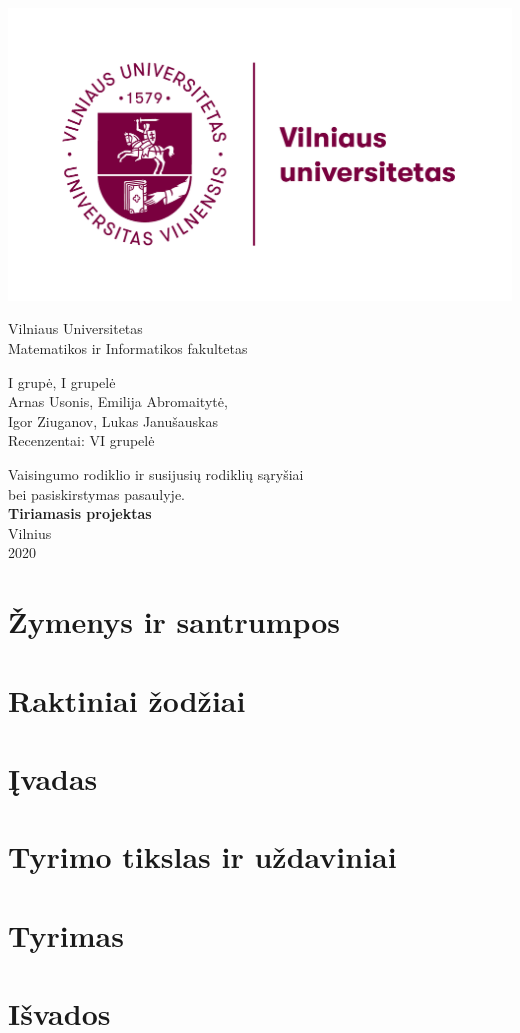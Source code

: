 \documentclass{article}
\begin{document}
\begin{titlepage}
    \centering
    \includegraphics[width=.5\textwidth]{pic/vu_logo.png} \\
    {\Huge
    Vilniaus Universitetas \\
    Matematikos ir Informatikos fakultetas\par} 
    \vspace{2cm}
    
    \Large
    {I grupė, I grupelė \\
    Arnas Usonis, Emilija Abromaitytė, \\ Igor Ziuganov, Lukas Janušauskas \\
    Recenzentai: VI grupelė\par}
    \vspace{1cm}
    {\LARGE
    Vaisingumo rodiklio ir susijusių rodiklių sąryšiai \\ bei pasiskirstymas pasaulyje. \\}
    \vspace{0.2cm}
    {\Large
    \textbf{Tiriamasis projektas \\}}
    \vspace*{\fill}
    Vilnius \\ 2020
    
    
\end{titlepage}
\pagebreak

\normalsize
\tableofcontents
\pagebreak

\section{Žymenys ir santrumpos}


\section{Raktiniai žodžiai}


\section{Įvadas}


\section{Tyrimo tikslas ir uždaviniai}


\section{Tyrimas}


\section{Išvados}

\end{document}
